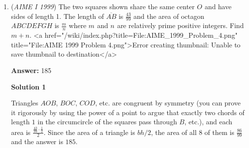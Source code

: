 \begin{enumerate}
 or $n = 18$.

 For $1 \leq n < 12$, it is easy to check that $n^2 -19n + 99$ is a perfect square when $n = 1, 9$ and $10$ ( using the identity $n^2 -19n + 99 = (n-10)^2 + n - 1.)$

 We conclude that the answer is $1 + 9 + 10 + 18 = \boxed{38}.$




\textbf{Solution 4 (Factoring and Midpoint Substitution)}

The problem states that we want to find integers $n$ such that, 
 \[n^2 - 19n + 99 = k^2 \text{, for some integer } k \in \mathbb{Z}\]Notice that the expression can be rewritten to,
 \[n^2 - 19n + 18 = k^2 - 81\]
 \[(n-18)(n-1) = k^2 - 81\]

 Using midpoint substitution, let $u = n - \frac{18+1}{2} = n - \frac{19}{2}$

 Substituting to the factored expression yields,
 \[\left(u-\frac{17}{2}\right)\left(u+\frac{17}{2}\right) = k^2 - 81\]
 \[u^2 - \left(\frac{17}{2}\right)^2 = k^2 - 81\]
 \[u^2 - k^2 = -\frac{35}{4}\]
 \[4(u+k)(u-k) = -35\]
 \[(2u + 2k)(2u - 2k) = -35\]Notice the factors of $-$$35$ are $(-5, 7), (5, -7), (-1, 35)$, and $(1, -35)$

 Solving the systems of equations for each factored pair gives $n = 1, 9, 10, 18$ and $1 + 9 + 10 + 18 = \boxed{38}$



	\item (\textit{AIME I 1999}) The two squares shown share the same center $O_{}$ and have sides of length 1. The length of $\overline{AB}$ is $\frac{43}{99}$ and the area of octagon $ABCDEFGH$ is $\frac{m}{n}$ where $m_{}$ and $n_{}$ are relatively prime positive integers.  Find $m+n.$
<a href="/wiki/index.php?title=File:AIME\_1999\_Problem\_4.png" title="File:AIME 1999 Problem 4.png">Error creating thumbnail: Unable to save thumbnail to destination</a>

 \textbf{Answer: }185



\textbf{Solution 1}

Triangles $AOB$, $BOC$, $COD$, etc. are congruent by symmetry (you can prove it rigorously by using the power of a point to argue that exactly two chords of length $1$ in the circumcircle of the squares pass through $B$, etc.), and each area is $\frac{\frac{43}{99}\cdot\frac{1}{2}}{2}$. Since the area of a triangle is $bh/2$, the area of all $8$ of them is $\frac{86}{99}$ and the answer is $\boxed{185}$.


\end{enumerate}
